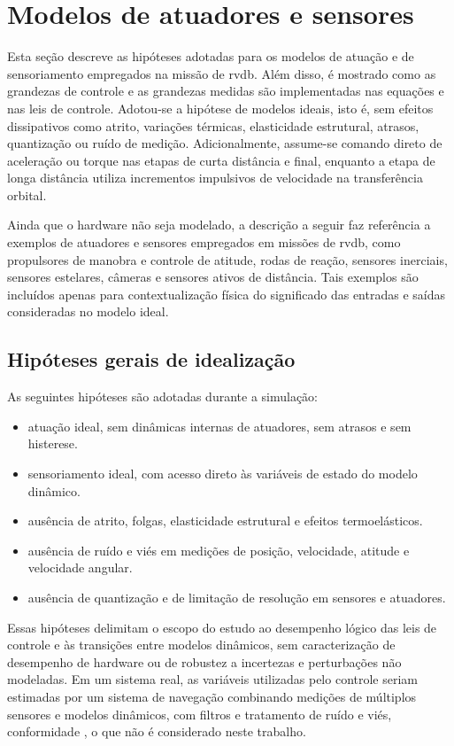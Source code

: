 \section{Modelos de atuadores e sensores}
\label{sec_modelos_atuadores_sensores}

Esta seção descreve as hipóteses adotadas para os modelos de atuação e de sensoriamento empregados na missão de \gls{rvdb}. 
Além disso, é mostrado como as grandezas de controle e as grandezas medidas são implementadas nas equações e nas leis de controle. 
Adotou-se a hipótese de modelos ideais, isto é, sem efeitos dissipativos como atrito, variações térmicas, elasticidade estrutural, atrasos, quantização ou ruído de medição.
Adicionalmente, assume-se comando direto de aceleração ou torque nas etapas de curta distância e final, enquanto a etapa de longa distância utiliza incrementos impulsivos de velocidade na transferência orbital.

Ainda que o hardware não seja modelado, a descrição a seguir faz referência a exemplos de atuadores e sensores empregados em missões de \gls{rvdb}, como propulsores de manobra e controle de atitude, rodas de reação, sensores inerciais, sensores estelares, câmeras e sensores ativos de distância.
Tais exemplos são incluídos apenas para contextualização física do significado das entradas e saídas consideradas no modelo ideal.

\subsection{Hipóteses gerais de idealização}
\label{subsec_hipoteses_idealizacao}

As seguintes hipóteses são adotadas durante a simulação:
\begin{itemize}
\item atuação ideal, sem dinâmicas internas de atuadores, sem atrasos e sem histerese.
\item sensoriamento ideal, com acesso direto às variáveis de estado do modelo dinâmico.
\item ausência de atrito, folgas, elasticidade estrutural e efeitos termoelásticos.
\item ausência de ruído e viés em medições de posição, velocidade, atitude e velocidade angular.
\item ausência de quantização e de limitação de resolução em sensores e atuadores.
\end{itemize}

Essas hipóteses delimitam o escopo do estudo ao desempenho lógico das leis de controle e às transições entre modelos dinâmicos, sem caracterização de desempenho de hardware ou de robustez a incertezas e perturbações não modeladas.
Em um sistema real, as variáveis utilizadas pelo controle seriam estimadas por um sistema de navegação combinando medições de múltiplos sensores e modelos dinâmicos, com filtros e tratamento de ruído e viés, conformidade \cite{wertz2011sme_smad}, o que não é considerado neste trabalho.

